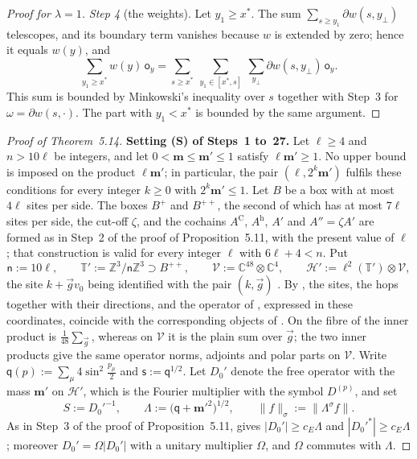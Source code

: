\documentclass[11pt,letterpaper,reqno]{amsart}
\theoremstyle{definition}
\begin{document}
\begin{proof}[Proof for $\lambda=1$]
\emph{Step 4} (the weights).
Let $y_1\ge x^*$.
The sum $\sum_{s\ge y_1}\partial w(s,y_\perp)$ telescopes, and its boundary term vanishes because $w$ is extended by zero;
hence it equals $w(y)$, and
\begin{equation*}
\sum_{y_1\ge x^*}w(y)\,\mathsf o_y=\sum_{s\ge x^*}\ \sum_{y_1\in[x^*,s]}\ \sum_{y_\perp}\partial w(s,y_\perp)\,\mathsf o_y.
\end{equation*}
This sum is bounded by Minkowski's inequality over $s$ together with Step~3 for $\omega=\partial w(s,\cdot)$.
The part with $y_1<x^*$ is bounded by the same argument.
\end{proof}

\begin{proof}[Proof of Theorem~5.14]
\textbf{Setting (S) of Steps~1 to~27.}
Let $\ell\ge4$ and $n>10\ell$ be integers, and let $0<\mathbf m\le\mathbf m'\le1$ satisfy $\ell\mathbf m'\ge1$.
No upper bound is imposed on the product $\ell\mathbf m'$;
in particular, the pair $(\ell,2^k\mathbf m')$ fulfils these conditions for every integer $k\ge0$ with $2^k\mathbf m'\le1$.
Let $B$ be a box with at most $4\ell$ sites per side.
The boxes $B^+$ and $B^{++}$, the second of which has at most $7\ell$ sites per side, the cut-off $\zeta$, and the cochains $A^{\mathrm C}$, $A^{\mathrm h}$, $A'$ and $A''=\zeta A'$ are formed as in Step~2 of the proof of Proposition~5.11, with the present value of $\ell$;
that construction is valid for every integer $\ell$ with $6\ell+4<n$.
Put
\begin{equation*}
\mathsf n:=10\ell,\qquad\mathbb T':=\mathbb Z^3/\mathsf n\mathbb Z^3\supset B^{++},\qquad\mathcal V:=\mathbb C^{48}\otimes\mathbb C^4,\qquad\mathcal H':=\ell^2(\mathbb T')\otimes\mathcal V,
\end{equation*}
the site $k+\vec gv_0$ being identified with the pair $(k,\vec g)$ \cite[Definition~2.10]{QEDII}.
By \cite[Proposition~46\,(a), (b)]{QEDIII}, the sites, the hops together with their directions, and the operator of \cite{QEDIII}, expressed in these coordinates, coincide with the corresponding objects of \cite{QEDII}.
On the fibre of \cite{QEDIII} the inner product is $\frac1{48}\sum_{\vec g}$, whereas on $\mathcal V$ it is the plain sum over $\vec g$;
the two inner products give the same operator norms, adjoints and polar parts on $\mathcal V$.
Write $\mathsf q(p):=\sum_\mu4\sin^2\frac{p_\mu}{2}$ and $\mathsf s:=\mathsf q^{1/2}$.
Let $D_0'$ denote the free operator with the mass $\mathbf m'$ on $\mathcal H'$, which is the Fourier multiplier with the symbol $D^{(p)}$, and set
\begin{equation*}
S:=D_0'^{-1},\qquad\Lambda:=\bigl(\mathsf q+\mathbf m'^2\bigr)^{1/2},\qquad\|f\|_\sigma:=\|\Lambda^\sigma f\|.
\end{equation*}
As in Step~3 of the proof of Proposition~5.11, \cite[Proposition~37.1\,(f)]{QEDIII} gives $|D_0'|\ge c_E\Lambda$ and $|D_0'^*|\ge c_E\Lambda$;
moreover $D_0'=\Omega|D_0'|$ with a unitary multiplier $\Omega$, and $\Omega$ commutes with $\Lambda$.


\end{proof}
\end{document}
